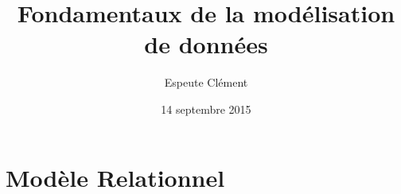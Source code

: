 \documentclass[11pt]{article}
\title{Fondamentaux de la modélisation de données}
\author{{\sc Espeute} Clément}
\date{14 septembre 2015}
\begin{document}
\pagestyle{fancy}
\maketitle
\newpage

\section{Modèle Relationnel}
\end{document}
